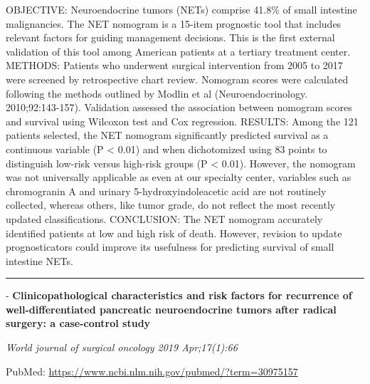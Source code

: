 \documentclass[]{article}
\begin{document}
OBJECTIVE: Neuroendocrine tumors (NETs) comprise 41.8\% of small
intestine malignancies. The NET nomogram is a 15-item prognostic tool
that includes relevant factors for guiding management decisions. This is
the first external validation of this tool among American patients at a
tertiary treatment center. METHODS: Patients who underwent surgical
intervention from 2005 to 2017 were screened by retrospective chart
review. Nomogram scores were calculated following the methods outlined
by Modlin et al (Neuroendocrinology. 2010;92:143-157). Validation
assessed the association between nomogram scores and survival using
Wilcoxon test and Cox regression. RESULTS: Among the 121 patients
selected, the NET nomogram significantly predicted survival as a
continuous variable (P \textless{} 0.01) and when dichotomized using 83
points to distinguish low-risk versus high-risk groups (P \textless{}
0.01). However, the nomogram was not universally applicable as even at
our specialty center, variables such as chromogranin A and urinary
5-hydroxyindoleacetic acid are not routinely collected, whereas others,
like tumor grade, do not reflect the most recently updated
classifications. CONCLUSION: The NET nomogram accurately identified
patients at low and high risk of death. However, revision to update
prognosticators could improve its usefulness for predicting survival of
small intestine NETs.

{}

{}

\begin{center}\rule{0.5\linewidth}{\linethickness}\end{center}

 - \textbf{Clinicopathological characteristics and risk factors for
recurrence of well-differentiated pancreatic neuroendocrine tumors after
radical surgery: a case-control study}

\emph{World journal of surgical oncology 2019 Apr;17(1):66}

PubMed: \url{https://www.ncbi.nlm.nih.gov/pubmed/?term=30975157}
\end{document}
